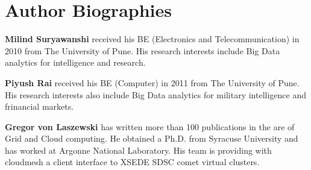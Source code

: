 \documentclass[9pt,twocolumn,twoside]{../../styles/osajnl}
\begin{document}

 
\section*{Author Biographies}
\begingroup
\setlength\intextsep{0pt}
\begin{minipage}{1.0\columnwidth}
  \noindent
  {\bfseries Milind Suryawanshi} received his BE (Electronics and
  Telecommunication) in 2010 from The University of Pune. His research
  interests include Big Data analytics for intelligence and research.
\end{minipage}
\begin{minipage}{1.0\columnwidth} 
  \noindent
  {\bfseries Piyush Rai} received his BE (Computer) in 2011 from The
  University of Pune. His research interests also include Big Data
  analytics for military intelligence and frinancial markets.
\end{minipage}
\begin{minipage}{1.0\columnwidth} 
  \noindent
  {\bfseries Gregor von Laszewski} has written more than 100
  publications in the are of Grid and Cloud computing. He obtained a
  Ph.D. from Syracuse University and has worked at Argonne National
  Laboratory. His team is providing with cloudmesh a client interface
  to XSEDE SDSC comet virtual clusters.
\end{minipage}

\endgroup
\end{document}
